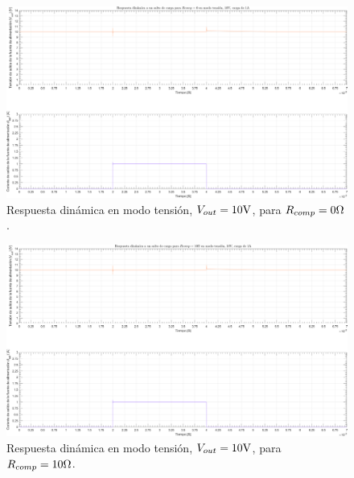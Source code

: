 \clearpage

\begin{figure}[H] %
\begin{center}
\includegraphics[width=1.1 \textwidth, angle=90]{./img/plots/dynamic/power_supply_RCOMP_0_STEP_Modo1.png}
\caption{\label{fig:fig_power_supply_RCOMP_STEP_5n_Modo1}\footnotesize{Respuesta dinámica en modo tensión, $V_{out} = 10 \si[per-mode=symbol]{\volt}$, para $R_{comp} = 0 \si[per-mode=symbol]{\ohm} $.}}
\end{center}
\end{figure}

\clearpage

\begin{figure}[H] %
\begin{center}
\includegraphics[width=1.1 \textwidth, angle=90]{./img/plots/dynamic/power_supply_RCOMP_10_STEP_Modo1.png}
\caption{\label{fig:fig_power_supply_RCOMP_STEP_10n_Modo1}\footnotesize{Respuesta dinámica en modo tensión, $V_{out} = 10 \si[per-mode=symbol]{\volt}$, para $R_{comp} = 10 \si[per-mode=symbol]{\ohm} $.}}
\end{center}
\end{figure}

